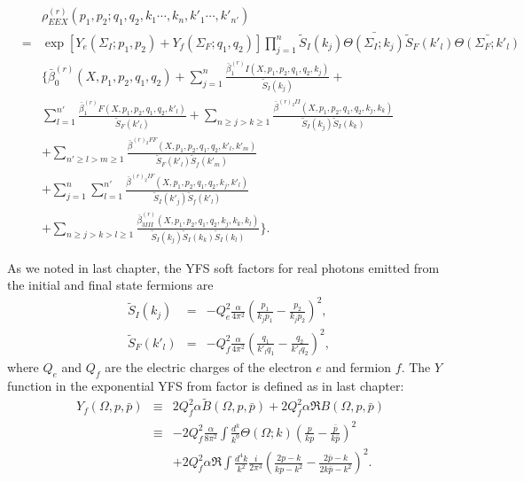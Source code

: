 \begin{eqnarray}
&&\rho_{EEX}^{(r)}(p_1, p_2;q_1,q_2,k_1\cdots,k_n,k'_1\cdots,k'_{n'})\nonumber\\&=&\exp\left[ Y_e(\Sigma_I;p_1,p_2)+Y_f(\Sigma_F;q_1,q_2)\right]\prod_{j=1}^n \tilde{S}_I (k_j)\bar{\Theta(\Sigma_I;k_j)} \tilde{S}_F (k'_l)\bar{\Theta(\Sigma_F;k'_l)}
\nonumber\\&&\Biggl\{ \bar{\beta}^{(r)}_0(X,p_1,p_2,q_1,q_2) +\sum_{j=1}^n\frac{\bar{\beta}^{(r)}_1I(X,p_1,p_2,q_1,q_2,k_j)}{\tilde{S}_I(k_j)} +\nonumber\\
&& \sum_{l=1}^{n'}\frac{\bar{\beta}^{(r)}_1F(X,p_1,p_2,q_1,q_2,k'_l)}{\tilde{S}_F(k'_l)}+\sum_{n\ge j > k\ge 1}\frac{\bar{\beta}^{(r)_2II}(X,p_1,p_2,q_1,q_2,k_j,k_k)}{\tilde{S}_I(k_j)\tilde{S}_I(k_k)}\nonumber\\
&&+\sum_{n'\ge l > m\ge 1}\frac{\bar{\beta}^{(r)_2FF}(X,p_1,p_2,q_1,q_2,k'_l,k'_m)}{\tilde{S}_F(k'_l)\tilde{S}_f(k'_m)}\nonumber\\
&&+\sum_{j=1}^{n}\sum_{l=1}^{n'}\frac{\bar{\beta}^{(r)_2IF}(X,p_1,p_2,q_1,q_2,k_j,k'_l)}{\tilde{S}_I(k'_j)\tilde{S}_f(k'_l)}
\nonumber\\
&& + \sum_{n\ge j > k>l\ge 1} \frac{\bar{\beta}^{(r)}_{3III}(X,p_1,p_2,q_1,q_2,k_j,k_k,k_l)}{\tilde{S}_I(k_j)\tilde{S}_I(k_k)\tilde{S}_I(k_l)} \Biggr\}.
\end{eqnarray}

As we noted in last chapter, the YFS soft factors for real photons emitted from the initial and final state
fermions are
\begin{eqnarray}
\tilde{S}_I(k_j)&=& -Q_e^2\frac{\alpha}{4\pi^2}\left(\frac{p_1}{k_j p_1}-\frac{p_2}{k_j p_2}\right)^2,\nonumber\\
\tilde{S}_F(k'_l)&=& -Q_f^2\frac{\alpha}{4\pi^2}\left(\frac{q_1}{k'_l q_1}-\frac{q_2}{k'_l q_2}\right)^2,\
\end{eqnarray}
where $Q_e$ and $Q_f$ are the electric charges of the electron $e$ and fermion $f$. The $Y$ function in the exponential YFS from factor is defined as in last chapter:
\begin{eqnarray}
Y_f(\Omega, p, \bar{p}) &\equiv& 2Q_f^2\alpha \tilde{B}(\Omega,p,\bar{p})+2Q_f^2\alpha \Re B(\Omega,p,\bar{p})\nonumber\\
&\equiv& -2Q_f^2\frac{\alpha}{8\pi^2}\int \frac{d^k}{k^0}\Theta(\Omega;k)\left( \frac{p}{kp}-\frac{\bar{p}}{k\bar{p}}\right)^2\nonumber\\
&&+2Q^2_f\alpha \Re \int \frac{d^4 k}{k^2}\frac{i}{2\pi^3}\left( \frac{2p-k}{kp-k^2} - \frac{2\bar{p}-k}{2k\bar{p}-k^2} \right)^2.
\end{eqnarray}


